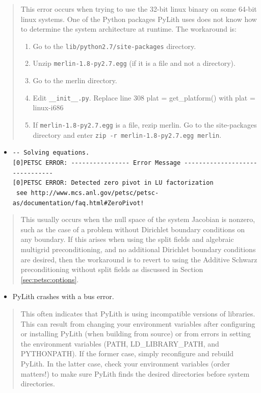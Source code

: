 \begin{quote}
This error occurs when trying to use the 32-bit linux binary on some
64-bit linux systems. One of the Python packages PyLith uses does
not know how to determine the system architecture at runtime. The
workaround is:
\begin{enumerate}
\item Go to the \texttt{lib/python2.7/site-packages} directory.
\item Unzip \texttt{merlin-1.8-py2.7.egg} (if it is a file and not a directory).
\item Go to the merlin directory.
\item Edit \texttt{\_\_init\_\_.py}. Replace line 308 plat = get\_platform()
with plat = \textquotedbl{}linux-i686\textquotedbl{}
\item If \texttt{merlin-1.8-py2.7.egg} is a file, rezip merlin. Go to the
site-packages directory and enter \textquotedbl{}\texttt{zip -r merlin-1.8-py2.7.egg
merlin}\textquotedbl{}.
\end{enumerate}
\end{quote}
\begin{itemize}
\item \texttt{-{}- Solving equations.}~\\
\texttt{{[}0{]}PETSC ERROR: -{}-{}-{}-{}-{}-{}-{}-{}-{}-{}-{}-{}-{}-{}-{}-
Error Message -{}-{}-{}-{}-{}-{}-{}-{}-{}-{}-{}-{}-{}-{}-{}-{}-{}-{}-{}-{}-{}-{}-{}-{}-{}-{}-{}-{}-{}-{}-
}~\\
\texttt{{[}0{]}PETSC ERROR: Detected zero pivot in LU factorization}~\\
\texttt{ see http://www.mcs.anl.gov/petsc/petsc-as/documentation/faq.html\#ZeroPivot!}\end{itemize}
\begin{quote}
This usually occurs when the null space of the system Jacobian is
nonzero, such as the case of a problem without Dirichlet boundary
conditions on any boundary. If this arises when using the split fields
and algebraic multigrid preconditioning, and no additional Dirichlet
boundary conditions are desired, then the workaround is to revert
to using the Additive Schwarz preconditioning without split fields
as discussed in Section \ref{sec:petsc:options}. \end{quote}
\begin{itemize}
\item PyLith crashes with a bus error.\end{itemize}
\begin{quote}
This often indicates that PyLith is using incompatible versions of
libraries. This can result from changing your environment variables
after configuring or installing PyLith (when building from source)
or from errors in setting the environment variables (PATH, LD\_LIBRARY\_PATH,
and PYTHONPATH). If the former case, simply reconfigure and rebuild
PyLith. In the latter case, check your environment variables (order
matters!) to make sure PyLith finds the desired directories before
system directories. \end{quote}
